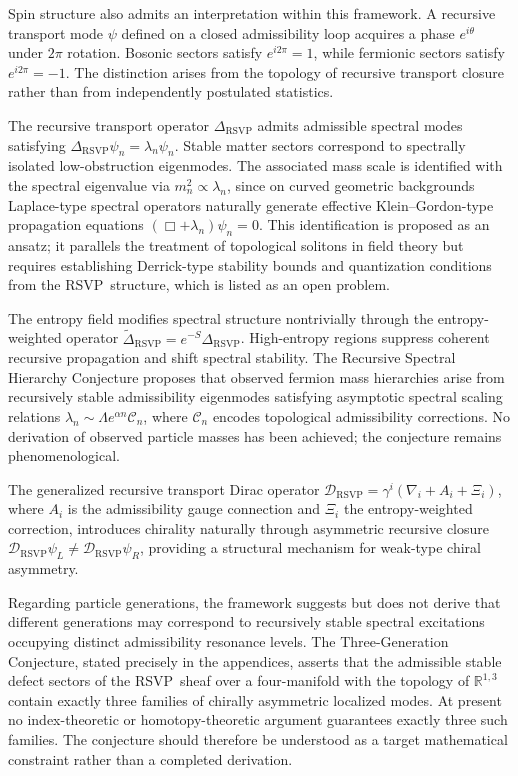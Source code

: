 \documentclass[12pt,a4paper]{article}
\newcommand{\RSVP}{\textrm{RSVP}}
\newcommand{\R}{\mathbb{R}}
\begin{document}
Spin structure also admits an interpretation within this framework. A recursive
transport mode $\psi$ defined on a closed admissibility loop acquires a phase
$e^{i\theta}$ under $2\pi$ rotation. Bosonic sectors satisfy $e^{i2\pi}=1$,
while fermionic sectors satisfy $e^{i2\pi}=-1$. The distinction arises from the
topology of recursive transport closure rather than from independently postulated
statistics.

The recursive transport operator $\Delta_\RSVP$ admits admissible spectral
modes satisfying $\Delta_\RSVP\psi_n=\lambda_n\psi_n$. Stable matter sectors
correspond to spectrally isolated low-obstruction eigenmodes. The associated
mass scale is identified with the spectral eigenvalue via $m_n^2\propto\lambda_n$,
since on curved geometric backgrounds Laplace-type spectral operators naturally
generate effective Klein--Gordon-type propagation equations
$(\Box+\lambda_n)\psi_n=0$. This identification is proposed as an ansatz; it
parallels the treatment of topological solitons in field theory but requires
establishing Derrick-type stability bounds and quantization conditions from the
\RSVP\ structure, which is listed as an open problem.

The entropy field modifies spectral structure nontrivially through the
entropy-weighted operator $\widetilde{\Delta}_\RSVP=e^{-S}\Delta_\RSVP$.
High-entropy regions suppress coherent recursive propagation and shift spectral
stability. The Recursive Spectral Hierarchy Conjecture proposes that observed
fermion mass hierarchies arise from recursively stable admissibility eigenmodes
satisfying asymptotic spectral scaling relations
$\lambda_n\sim\Lambda e^{\alpha n}\mathcal{C}_n$,
where $\mathcal{C}_n$ encodes topological admissibility corrections. No
derivation of observed particle masses has been achieved; the conjecture remains
phenomenological.

The generalized recursive transport Dirac operator
$\mathcal{D}_\RSVP=\gamma^i(\nabla_i+A_i+\Xi_i)$,
where $A_i$ is the admissibility gauge connection and $\Xi_i$ the entropy-weighted
correction, introduces chirality naturally through asymmetric recursive closure
$\mathcal{D}_\RSVP\psi_L\neq\mathcal{D}_\RSVP\psi_R$, providing a structural
mechanism for weak-type chiral asymmetry.

Regarding particle generations, the framework suggests but does not derive that
different generations may correspond to recursively stable spectral excitations
occupying distinct admissibility resonance levels. The Three-Generation
Conjecture, stated precisely in the appendices, asserts that the admissible
stable defect sectors of the \RSVP\ sheaf over a four-manifold with the topology
of $\R^{1,3}$ contain exactly three families of chirally asymmetric localized
modes. At present no index-theoretic or homotopy-theoretic argument guarantees
exactly three such families. The conjecture should therefore be understood as a
target mathematical constraint rather than a completed derivation.
\end{document}
